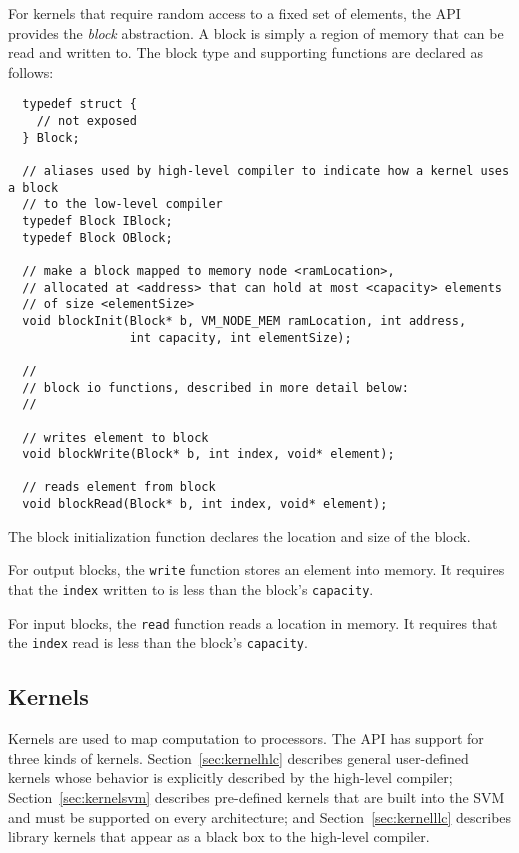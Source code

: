 For kernels that require random access to a fixed set of elements, the API provides the {\it block} abstraction.  A block is simply a region of memory that can be read and written to.  The block type and 
supporting functions are declared as follows:

{\small
\begin{verbatim}
  typedef struct {
    // not exposed
  } Block;

  // aliases used by high-level compiler to indicate how a kernel uses a block
  // to the low-level compiler
  typedef Block IBlock;
  typedef Block OBlock;

  // make a block mapped to memory node <ramLocation>, 
  // allocated at <address> that can hold at most <capacity> elements
  // of size <elementSize>
  void blockInit(Block* b, VM_NODE_MEM ramLocation, int address, 
                 int capacity, int elementSize);

  //
  // block io functions, described in more detail below:
  //

  // writes element to block
  void blockWrite(Block* b, int index, void* element);

  // reads element from block
  void blockRead(Block* b, int index, void* element); \end{verbatim}}

 The block initialization function declares the location and size of the block.


 For output blocks, the {\tt write} function stores an element into memory.  It requires that the {\tt index} written to is less than the block's {\tt capacity}.  

 For input blocks, the {\tt read} function reads a location in memory.  It requires that the {\tt index} read is less than the block's {\tt capacity}.

\subsection{Kernels}
\label{sec:kernel}

Kernels are used to map computation to processors. 
The API has support for three kinds of kernels. Section~\ref{sec:kernelhlc} describes general user-defined kernels whose behavior is explicitly described by the high-level compiler; Section~\ref{sec:kernelsvm} describes pre-defined kernels that are built into the SVM and must be supported on every architecture; and Section~\ref{sec:kernelllc} describes library kernels that appear as a black box to the high-level compiler. 

